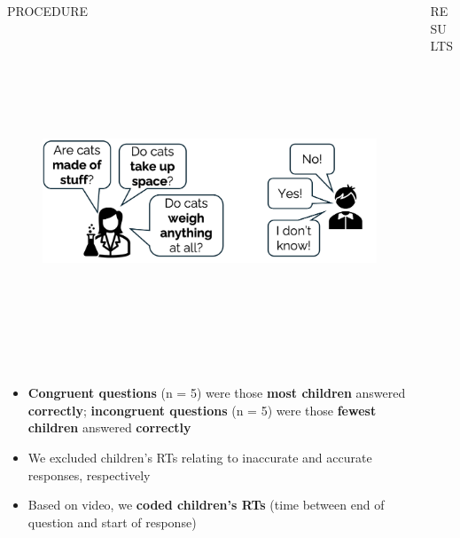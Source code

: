 \documentclass[final]{beamer}
\newlength{\colwidth}
\newlength{\widecolwidth}
\begin{document}
\begin{frame}[t]
\begin{columns}[t]
\begin{column}{\colwidth}
\begin{block}{PROCEDURE}
    \begin{figure}
      \centering
	{\includegraphics[height=10cm]{images/procedure1.png}}
    \end{figure}

    \begin{itemize}
    	\item \textbf{Congruent questions} (n = 5) were those \textbf{most children} answered \textbf{correctly}; \textbf{incongruent questions} (n = 5) were those \textbf{fewest children} answered \textbf{correctly}
	\item We excluded children's RTs relating to inaccurate and accurate responses, respectively
	\item Based on video, we \textbf{coded children's RTs} (time between end of question and start of response)
    \end{itemize}
    
  \end{block}

\end{column}

\begin{column}{\widecolwidth}

  \begin{block}{RESULTS}


\end{block}
\end{column}
\end{columns}
\end{frame}
\end{document}
